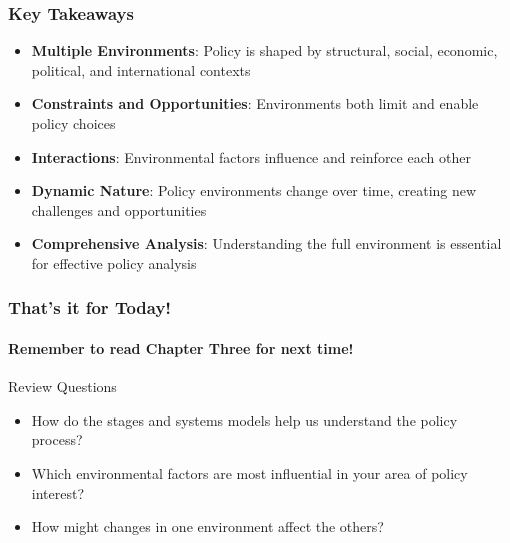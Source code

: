 \documentclass[10pt]{beamer}
\begin{document}
\begin{frame}
\frametitle{Key Takeaways}

\begin{block}{}
\begin{itemize}
\item \textbf{Multiple Environments}: Policy is shaped by structural, social, economic, political, and international contexts
\item \textbf{Constraints and Opportunities}: Environments both limit and enable policy choices
\item \textbf{Interactions}: Environmental factors influence and reinforce each other
\item \textbf{Dynamic Nature}: Policy environments change over time, creating new challenges and opportunities
\item \textbf{Comprehensive Analysis}: Understanding the full environment is essential for effective policy analysis
\end{itemize}
\end{block}

\end{frame}

\begin{frame}
\frametitle{That's it for Today!}
\framesubtitle{Remember to read Chapter Three for next time!}

\begin{block}{Review Questions}
\begin{itemize}
\item How do the stages and systems models help us understand the policy process?
\item Which environmental factors are most influential in your area of policy interest?
\item How might changes in one environment affect the others?
\end{itemize}
\end{block}

\end{frame}
\end{document}
